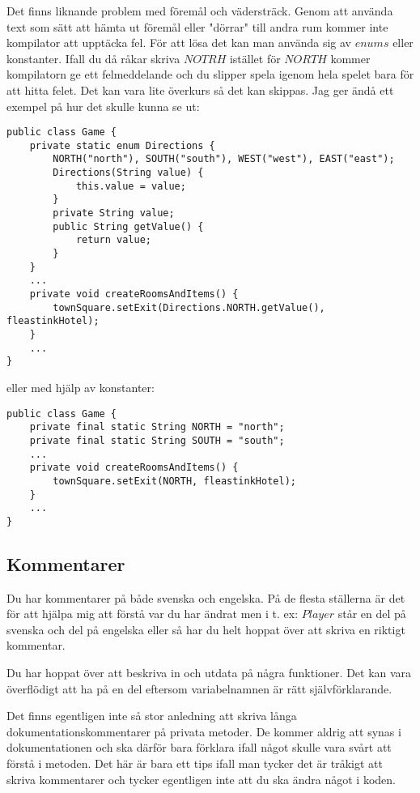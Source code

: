 \documentclass[a4paper,11pt]{article}
\begin{document}
Det finns liknande problem med föremål och vädersträck. Genom att använda text som sätt att hämta ut föremål eller "dörrar" till andra rum kommer inte kompilator att upptäcka fel. För att lösa det kan man använda sig av $enums$ eller konstanter. Ifall du då råkar skriva $NOTRH$ istället för $NORTH$ kommer kompilatorn ge ett felmeddelande och du slipper spela igenom hela spelet bara för att hitta felet. Det kan vara lite överkurs så det kan skippas. Jag ger ändå ett exempel på hur det skulle kunna se ut:
\begin{lstlisting}
public class Game {
    private static enum Directions {
        NORTH("north"), SOUTH("south"), WEST("west"), EAST("east");
        Directions(String value) {
            this.value = value;
        }
        private String value;
        public String getValue() {
            return value;
        }
    }
    ...
    private void createRoomsAndItems() {
    	townSquare.setExit(Directions.NORTH.getValue(), fleastinkHotel);
    }
    ...
}
\end{lstlisting}
eller med hjälp av konstanter:
\begin{lstlisting}
public class Game {
    private final static String NORTH = "north";
    private final static String SOUTH = "south";
    ...
    private void createRoomsAndItems() {
    	townSquare.setExit(NORTH, fleastinkHotel);
    }
    ...
}
\end{lstlisting}
\subsection{Kommentarer}
Du har kommentarer på både svenska och engelska. På de flesta ställerna är det för att hjälpa mig att förstå var du har ändrat men i t. ex: $Player$ står en del på svenska och del på engelska eller så har du helt hoppat över att skriva en riktigt kommentar.

Du har hoppat över att beskriva in och utdata på några funktioner. Det kan vara överflödigt att ha på en del eftersom variabelnamnen är rätt självförklarande. 

Det finns egentligen inte så stor anledning att skriva långa dokumentationskommentarer på privata metoder. De kommer aldrig att synas i dokumentationen och ska därför bara förklara ifall något skulle vara svårt att förstå i metoden. Det här är bara ett tips ifall man tycker det är tråkigt att skriva kommentarer och tycker egentligen inte att du ska ändra något i koden.
\end{document}
